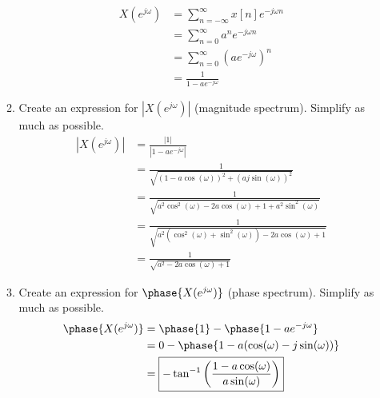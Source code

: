 \documentclass{article}
\begin{document}
\begin{enumerate}
\begin{enumerate}
        \begin{align}
            X(e^{j\omega}) &= \sum_{n=-\infty}^\infty x[n]e^{-j\omega n}\\
            &= \sum_{n=0}^\infty a^ne^{-j\omega n}\\
            &= \sum_{n=0}^\infty (ae^{-j\omega})^n\\
            &= \boxed{\frac{1}{1-ae^{-j\omega}}}
        \end{align}
        \item Create an expression for $|X(e^{j\omega})|$ (magnitude spectrum). Simplify as much as possible.
        \begin{align}
            |X(e^{j\omega})| &= \frac{|1|}{|1-ae^{-j\omega}|}\\
            &= \frac{1}{\sqrt{(1-a\cos(\omega))^2+(aj\sin(\omega))^2}}\\
            &= \frac{1}{\sqrt{a^2\cos^2(\omega)-2a\cos(\omega)+1+a^2\sin^2(\omega)}}\\
            &= \frac{1}{\sqrt{a^2(\cos^2(\omega)+\sin^2(\omega))-2a\cos(\omega)+1}}\\
            &= \boxed{\frac{1}{\sqrt{a^2-2a\cos(\omega)+1}}}
        \end{align}
        
        \item Create an expression for $\phase{X(e^{j\omega})}$ (phase spectrum). Simplify as much as possible.
        \begin{align}
            \phase{X(e^{j\omega})} &= \phase{1}-\phase{1-ae^{-j\omega}}\\
            &= 0-\phase{1-a(\cos(\omega)-j\sin(\omega))}\\
            &= \boxed{-\tan^{-1}\left(\frac{1-a\cos(\omega)}{a\sin(\omega)}\right)}
        \end{align}
    \end{enumerate}
\end{enumerate}
\end{document}
